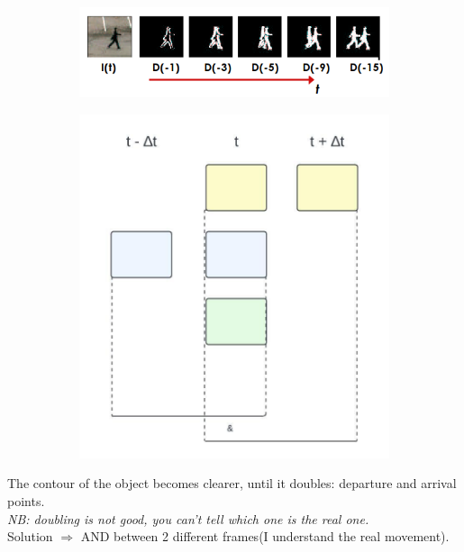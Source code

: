 \begin{figure}[h]
    \begin{subfigure}{0.6\textwidth}
        \includegraphics[scale=0.5]{Figures/FrameDifferencing.png} 
    \end{subfigure}
    \begin{subfigure}{0.4\textwidth}
        \includegraphics[scale=0.5]{Figures/DifferencingDiagram.jpeg}    \end{subfigure}
        \label{fig:image2}
\end{figure}
The contour of the object becomes clearer, until it doubles: departure and arrival points.
\\\textit{NB: doubling is not good, you can't tell which one is the real one.}
\\Solution $\Rightarrow$ AND between 2 different frames(I understand the real movement).
